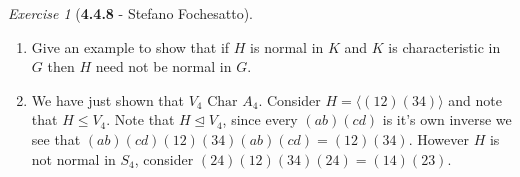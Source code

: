 \documentclass[12pt]{amsart}
\makeatletter
\theoremstyle{remark}
\newtheorem*{exercise}{Exercise}%
\renewenvironment{proof}[1][\proofname]{\par\doublespacing
  \pushQED{\qed}%
  \normalfont \topsep6\p@\@plus6\p@\relax
  \list{}{%
    \settowidth{\leftmargin}{\itshape\proofname:\hskip\labelsep}%
    \setlength{\labelwidth}{0pt}%
    \setlength{\itemindent}{-\leftmargin}%
  }%
  \item[\hskip\labelsep\itshape#1\@addpunct{:}]\ignorespaces
}{%
  \popQED\endlist\@endpefalse
  \singlespacing
}
\theoremstyle{mycomment}
\makeatother
\begin{document}
\begin{exercise}[\textbf{4.4.8} - Stefano Fochesatto]
\begin{enumerate}
    \item[c.] Give an example to show that if $H$ is normal in $K$ and $K$ is characteristic in $G$ then $H$ need not be normal in $G$. \\
    \begin{proof}[Solution] We have just shown that $V_4 \text{ Char } A_4$. Consider $H = \langle (12)(34) \rangle$ and note that $H \leq V_4$. Note that 
      $H \trianglelefteq V_4$, since every $(ab)(cd)$ is it's own inverse we see that $(ab)(cd)(12)(34)(ab)(cd) = (12)(34)$. However $H$ is not normal in $S_4$, 
      consider $(24)(12)(34)(24) = (14)(23)$.   
    \end{proof}
  \end{enumerate}

\end{exercise}
\vspace{.15in}
\end{document}
